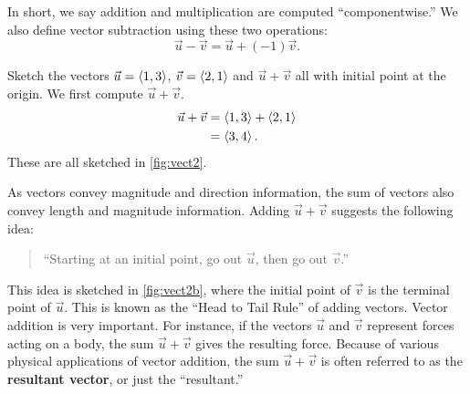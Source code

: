 In short, we say addition and multiplication are computed ``componentwise.''  We also define vector subtraction using these two operations:
\[\vec u-\vec v = \vec u + (-1)\vec v.\]

\begin{example}\label{ex_vect2}%
Sketch the vectors $\vec u =\left\langle 1,3\right\rangle$, $\vec v =\left\langle 2,1\right\rangle$ and $\vec u+\vec v$ all with initial point at the origin.
\solution
We first compute $\vec u +\vec v$.
%
%
\begin{align*}
	\vec u+\vec v &=\left\langle 1,3\right\rangle+\left\langle 2,1\right\rangle\\
	&=\left\langle 3,4\right\rangle.
\end{align*}
These are all sketched in \autoref{fig:vect2}.
\end{example}

As vectors convey magnitude and direction information, the sum of vectors also convey length and magnitude information. Adding $\vec u+\vec v$ suggests the following idea:
\begin{quotation}
``Starting at an initial point, go out $\vec u$, then go out $\vec v$.''
\end{quotation}

This idea is sketched in \autoref{fig:vect2b}, where the initial point of $\vec v$ is the terminal point of $\vec u$. This is known as the ``Head to Tail Rule'' of adding vectors. Vector addition is very important. For instance, if the vectors $\vec u$ and $\vec v$ represent forces acting on a body, the sum $\vec u+\vec v$ gives the resulting force. Because of various physical applications of vector addition, the sum $\vec u+\vec v$ is often referred to as the \textbf{resultant vector}, or just the ``resultant.''

